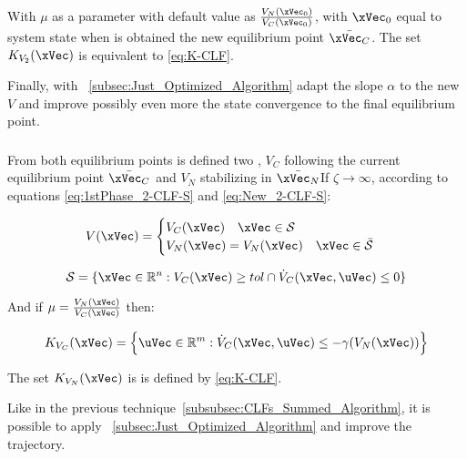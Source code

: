 With \(\mu\) as a parameter with default value as \( \frac{V_{N}(\xVec_0)}{V_{C}(\xVec_0)} \), with \(\xVec_0\) equal to system state when is obtained the new equilibrium point \(\bar{\xVec_C}\). The set \(K_{V_2}(\xVec)\) is equivalent to \ref{eq:K-CLF}. \par

Finally, with ~\ref{subsec:Just_Optimized_Algorithm} adapt the  slope \(\alpha\) to the new  \(V\) and improve possibly even more the state convergence to the final equilibrium point.\\





\subsubsection{}
\label{subsubsec:CLFs_Independent_Algorithm}

From both equilibrium points is defined two , \(V_C\) following the current equilibrium point \(\bar{\xVec_C}\) and \(V_N\) stabilizing in \(\bar{\xVec_N}\)If \(\zeta \to \infty\), according to equations \ref{eq:1stPhase_2-CLF-S} and \ref{eq:New_2-CLF-S}:


\begin{align}
    V(\xVec) = 
    \begin{cases}
        V_C(\xVec) \quad \xVec \in \mathcal{S}\\
        V_N(\xVec) = V_{N}(\xVec) \quad \xVec \in \bar{\mathcal{S}}
    \end{cases}
    \label{eq:New_2-CLF-I}
\end{align}


\begin{equation}
    \mathcal{S} = \{\xVec \in \mathbb{R}^n: V_{C}(\xVec) \geq tol \cap \dot{V}_{C}(\xVec, \uVec) \leq 0 \}
    \label{eq:New_2-CLF-I_actuationPhaseSet}
\end{equation}



And if \(\mu = \frac{V_{N}(\xVec)}{V_{C}(\xVec)}\) then:

\begin{align}
    K_{V_C}(\xVec) = \Bigl\{\uVec \in \mathbb{R}^m:  \dot{V}_{C}(\xVec, \uVec) \leq -\gamma( V_{N}(\xVec)  )\Bigr\}
    \label{eq:2-CLF-I_Constraint}
\end{align}

The set \(K_{V_N}(\xVec)\) is is defined by \ref{eq:K-CLF}. \par
Like in the previous technique~\ref{subsubsec:CLFs_Summed_Algorithm}, it is possible to apply ~\ref{subsec:Just_Optimized_Algorithm} and improve the trajectory.\\


